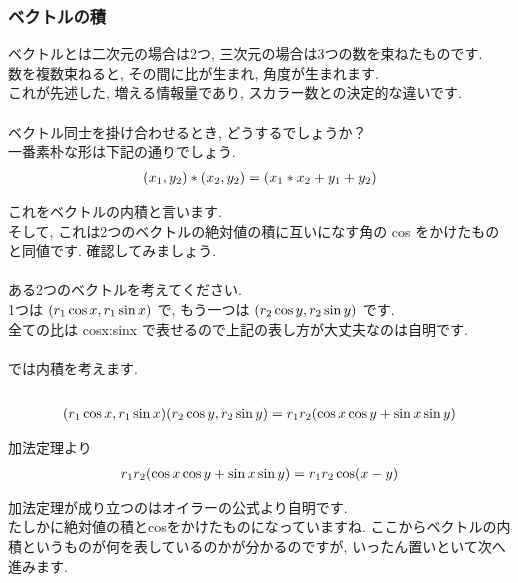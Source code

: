 \documentclass[11pt,a4paper]{jsarticle}
\begin{document}
\subsubsection{ベクトルの積}
ベクトルとは二次元の場合は2つ, 三次元の場合は3つの数を束ねたものです. \\
数を複数束ねると, その間に比が生まれ, 角度が生まれます. \\
これが先述した, 増える情報量であり, スカラー数との決定的な違いです.\\
\\
ベクトル同士を掛け合わせるとき, どうするでしょうか？\\
一番素朴な形は下記の通りでしょう.\\
\begin{eqnarray}
(\mathstrut x_1 , \mathstrut y_2) * (\mathstrut x_2 , \mathstrut y_2 ) = (\mathstrut x_1 * \mathstrut x_2 + \mathstrut y_1 + \mathstrut y_2)
\end{eqnarray}

これをベクトルの内積と言います.\\
そして, これは2つのベクトルの絶対値の積に互いになす角の cos をかけたものと同値です. 確認してみましょう.\\
\\
ある2つのベクトルを考えてください.\\
1つは $(\mathstrut r_1\cos x , \mathstrut r_1\sin x)$ で, もう一つは 
$(\mathstrut r_2\cos y , \mathstrut r_2\sin y)$ です.
\\
全ての比は cosx:sinx で表せるので上記の表し方が大丈夫なのは自明です.\\
\\
では内積を考えます.\\
\\
\begin{eqnarray}
(\mathstrut r_1\cos x, \mathstrut r_1\sin x)(\mathstrut r_2\cos y, \mathstrut r_2\sin y) = \mathstrut r_1\mathstrut r_2(\cos x\cos y + \sin x\sin y)
\end{eqnarray}

加法定理より
\begin{eqnarray}
\mathstrut r_1\mathstrut r_2(\cos x\cos y + \sin x\sin y) = \mathstrut r_1\mathstrut r_2\cos (\mathstrut x- \mathstrut y)
\end{eqnarray}

加法定理が成り立つのはオイラーの公式より自明です.\\
たしかに絶対値の積とcosをかけたものになっていますね. ここからベクトルの内積というものが何を表しているのかが分かるのですが, いったん置いといて次へ進みます.\\
\end{document}
